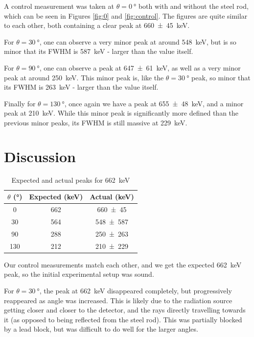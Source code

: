 \documentclass[a4paper]{scrartcl}
\begin{document}
A control measurement was taken at \(\theta = \SI{0}{\degree}\) both with and without the steel rod, which can be seen in Figures \ref{fig:0} and \ref{fig:control}. The figures are quite similar to each other, both containing a clear peak at \SI{660 \pm 45}{\kilo\electronvolt}.

For \(\theta = \SI{30}{\degree}\), one can observe a very minor peak at around \SI{548}{\kilo\electronvolt}, but is so minor that its FWHM is \SI{587}{\kilo\electronvolt} - larger than the value itself.

For \(\theta = \SI{90}{\degree}\), one can observe a peak at \SI{647 \pm 61}{\kilo\electronvolt}, as well as a very minor peak at around \SI{250}{\kilo\electronvolt}. This minor peak is, like the \(\theta = \SI{30}{\degree}\) peak, so minor that its FWHM is \SI{263}{\kilo\electronvolt} - larger than the value itself.

Finally for \(\theta = \SI{130}{\degree}\), once again we have a peak at \SI{655 \pm 48}{\kilo\electronvolt}, and a minor peak at \SI{210}{\kilo\electronvolt}. While this minor peak is significantly more defined than the previous minor peaks, its FWHM is still massive at \SI{229}{\kilo\electronvolt}.

\section{Discussion}
\begin{table}
    \centering
    \begin{tabular}{c | c | c}
        \(\theta\) (\si{\degree}) & Expected (\si{\kilo\electronvolt}) & Actual (\si{\kilo\electronvolt}) \\
        \hline
        0 & 662 & \SI{660 \pm 45}{} \\
        30 & 564 & \SI{548 \pm 587}{} \\
        90 & 288 & \SI{250 \pm 263}{} \\
        130 & 212 & \SI{210 \pm 229}{}
    \end{tabular}
    \caption{Expected and actual peaks for \SI{662}{\kilo\electronvolt}}
    \label{tab:expected-vs-actual}
\end{table}

Our control measurements match each other, and we get the expected \SI{662}{\kilo\electronvolt} peak, so the initial experimental setup was sound.

For \(\theta = \SI{30}{\degree}\), the peak at \SI{662}{\kilo\electronvolt} disappeared completely, but progressively reappeared as angle was increased. This is likely due to the radiation source getting closer and closer to the detector, and the rays directly travelling towards it (as opposed to being reflected from the steel rod). This was partially blocked by a lead block, but was difficult to do well for the larger angles.
\end{document}
